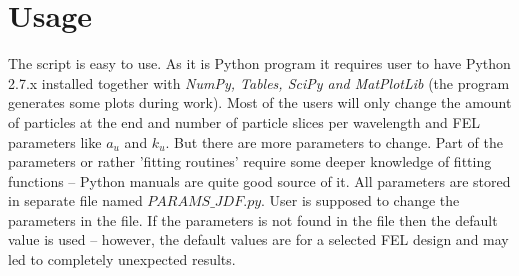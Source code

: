 \documentclass[12pt]{article}
\begin{document}
\section{Usage}
The script is easy to use. As it is Python program it requires user to have Python 2.7.x installed together with {\it NumPy, Tables, SciPy and MatPlotLib} (the program generates some plots during work). Most of the users will only change the amount of particles at the end and number of particle slices per wavelength and FEL parameters like $a_u$ and $k_u$. But there are more parameters to change. Part of the parameters or rather 'fitting routines' require some deeper knowledge of fitting functions -- Python manuals are quite good source of it. All parameters are stored in separate file named $PARAMS\_JDF.py$. User is supposed to change the parameters in the file. If the parameters is not found in the file then the default value is used -- however, the default values are for a selected FEL design and may led to completely unexpected results.
\end{document}
